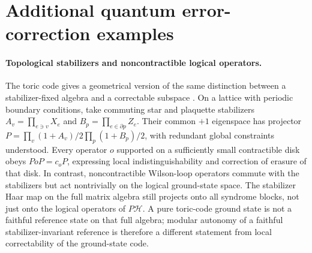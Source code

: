 \documentclass[a4paper,11pt]{article}
\theoremstyle{definition}
\newcommand{\cH}{\mathcal{H}}
\begin{document}
\section{Additional quantum error-correction examples}\label{app:extra-qec-examples}
\paragraph{Topological stabilizers and noncontractible logical operators.}
The toric code gives a geometrical version of the same distinction
between a stabilizer-fixed algebra and a correctable subspace
\cite{Kitaev2003}. On a lattice with periodic boundary conditions,
take commuting star and plaquette stabilizers
$A_v=\prod_{e\ni v}X_e$ and $B_p=\prod_{e\in\partial p}Z_e$.
Their common $+1$ eigenspace has projector
$P=\prod_v(1+A_v)/2\prod_p(1+B_p)/2$, with redundant global
constraints understood. Every operator $o$ supported on a sufficiently
small contractible disk obeys $PoP=c_oP$, expressing local
indistinguishability and correction of erasure of that disk. In contrast,
noncontractible Wilson-loop operators commute with the stabilizers but
act nontrivially on the logical ground-state space. The stabilizer Haar
map on the full matrix algebra still projects onto all syndrome blocks,
not just onto the logical operators of $P\cH$. A pure toric-code ground
state is not a faithful reference state on that full algebra; modular
autonomy of a faithful stabilizer-invariant reference is therefore a
different statement from local correctability of the ground-state code.
\end{document}
